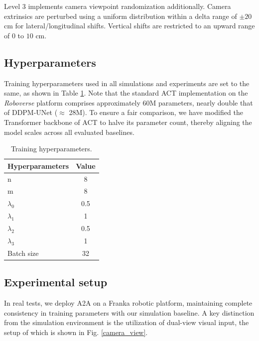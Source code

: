 \documentclass[onecolumn]{fairmeta}
\newcommand{\m}[1]{{A2A}}
\begin{document}
	Level 3 implements camera viewpoint randomization additionally. Camera extrinsics are perturbed using a uniform distribution within a delta range of $\pm 20$cm for lateral/longitudinal shifts. Vertical shifts are restricted to an upward range of $0$ to $10$ cm.
	
	
	\subsection{Hyperparameters} \label{appen_param}
	
	Training hyperparameters used in all simulations and experiments are set to the same, as shown in Table \ref{tab-parameters}. Note that the standard ACT implementation on the \textit{Roboverse} platform comprises approximately 60M parameters, nearly double that of DDPM-UNet ($\approx$ 28M). To ensure a fair comparison, we have modified the Transformer backbone of ACT to halve its parameter count, thereby aligning the model scales across all evaluated baselines.
	
	\renewcommand*{\thetable}{S1}
	\begin{table}[ht]
		\caption{Training hyperparameters.}
		\label{tab-parameters}
		\centering
		\begin{tabular}{lc}
			\toprule
			\textbf{Hyperparameters} & \textbf{Value} \\
			\midrule
			n & 8 \\
			m & 8  \\
			$\lambda_0$          & 0.5 \\
			$\lambda_1$          & 1   \\
			$\lambda_2$          & 0.5  \\
			$\lambda_3$          & 1   \\
			Batch size           & 32   \\
			\bottomrule
		\end{tabular}
	\end{table}
	
	\subsection{Experimental setup}
	In real tests, we deploy \m{} on a Franka robotic platform, maintaining complete consistency in training parameters with our simulation baseline. A key distinction from the simulation environment is the utilization of dual-view visual input, the setup of which is shown in Fig. \ref{camera_view}.
	
\end{document}
